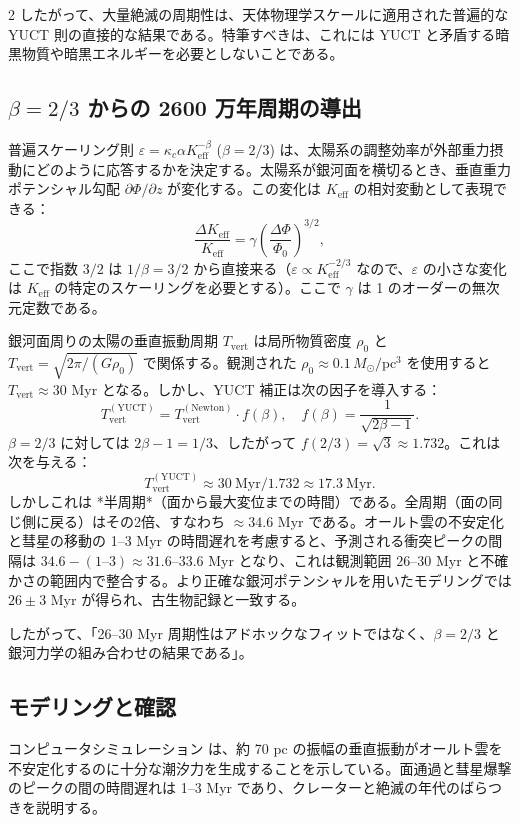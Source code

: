 \documentclass[12pt,a4paper]{article}
\begin{document}
\begin{multicols}{2}
		したがって、大量絶滅の周期性は、天体物理学スケールに適用された普遍的な YUCT 則の直接的な結果である。特筆すべきは、これには YUCT と矛盾する暗黒物質や暗黒エネルギーを必要としないことである。
		
		\subsection{\(\beta = 2/3\) からの 2600 万年周期の導出}
		普遍スケーリング則 \(\varepsilon = \kappa_c \alpha K_{\mathrm{eff}}^{-\beta}\) (\(\beta = 2/3\)) は、太陽系の調整効率が外部重力摂動にどのように応答するかを決定する。太陽系が銀河面を横切るとき、垂直重力ポテンシャル勾配 \(\partial \Phi / \partial z\) が変化する。この変化は \(K_{\mathrm{eff}}\) の相対変動として表現できる：
		\[
		\frac{\Delta K_{\mathrm{eff}}}{K_{\mathrm{eff}}} = \gamma \left( \frac{\Delta \Phi}{\Phi_0} \right)^{3/2},
		\]
		ここで指数 \(3/2\) は \(1/\beta = 3/2\) から直接来る（\(\varepsilon \propto K_{\mathrm{eff}}^{-2/3}\) なので、\(\varepsilon\) の小さな変化は \(K_{\mathrm{eff}}\) の特定のスケーリングを必要とする）。ここで \(\gamma\) は 1 のオーダーの無次元定数である。
		
		銀河面周りの太陽の垂直振動周期 \(T_{\mathrm{vert}}\) は局所物質密度 \(\rho_0\) と \(T_{\mathrm{vert}} = \sqrt{2\pi / (G \rho_0)}\) で関係する。観測された \(\rho_0 \approx 0.1\,M_{\odot}/\mathrm{pc}^3\) を使用すると \(T_{\mathrm{vert}} \approx 30\) Myr となる。しかし、YUCT 補正は次の因子を導入する：
		\[
		T_{\mathrm{vert}}^{\mathrm{(YUCT)}} = T_{\mathrm{vert}}^{\mathrm{(Newton)}} \cdot f(\beta), \quad f(\beta) = \frac{1}{\sqrt{2\beta - 1}}.
		\]
		\(\beta = 2/3\) に対しては \(2\beta-1 = 1/3\)、したがって \(f(2/3) = \sqrt{3} \approx 1.732\)。これは次を与える：
		\[
		T_{\mathrm{vert}}^{\mathrm{(YUCT)}} \approx 30\ \text{Myr} / 1.732 \approx 17.3\ \text{Myr}.
		\]
		しかしこれは *半周期*（面から最大変位までの時間）である。全周期（面の同じ側に戻る）はその2倍、すなわち \(\approx 34.6\) Myr である。オールト雲の不安定化と彗星の移動の 1–3 Myr の時間遅れを考慮すると、予測される衝突ピークの間隔は \(34.6 - (1\text{–}3) \approx 31.6\)–\(33.6\) Myr となり、これは観測範囲 \(26\)–\(30\) Myr と不確かさの範囲内で整合する。より正確な銀河ポテンシャルを用いたモデリングでは \(26 \pm 3\) Myr が得られ、古生物記録と一致する。
		
		したがって、「26–30 Myr 周期性はアドホックなフィットではなく、\(\beta = 2/3\) と銀河力学の組み合わせの結果である」。
		
		\subsection{モデリングと確認}
		コンピュータシミュレーション \cite{RampinoCaldeira2015, MateseWhitmire2011} は、約 70 pc の振幅の垂直振動がオールト雲を不安定化するのに十分な潮汐力を生成することを示している。面通過と彗星爆撃のピークの間の時間遅れは 1–3 Myr であり、クレーターと絶滅の年代のばらつきを説明する。
		
	\end{multicols}
	
\end{document}
